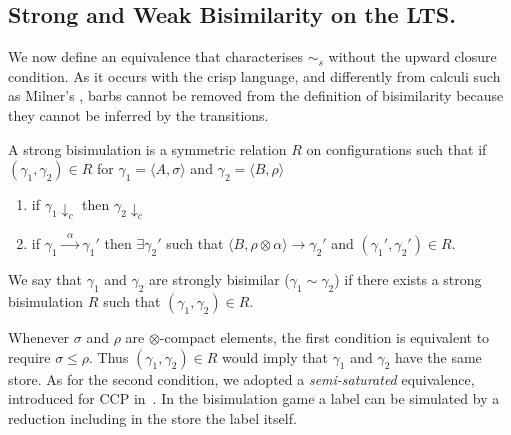 \documentclass[main.tex]{subfiles}
\begin{document}
\subsection{Strong and Weak Bisimilarity on the LTS.}
We now define an equivalence that
characterises  $\sim_{\mathit{s}}$ without the upward closure condition. 
As it occurs with the crisp language, and differently from calculi such as Milner's \CCS, 
barbs cannot be removed
from the definition of bisimilarity because they cannot be inferred by the transitions.


\begin{definition}\label{def:strong} 
A strong bisimulation is a symmetric relation $R$
on configurations such that if $(\gamma_1, \gamma_2) \in R$ for $\gamma_1 = \langle A, \sigma \rangle$ and $\gamma_2 = \langle B, \rho\rangle$
\begin{enumerate}
\item if $\gamma_1 \downarrow_c$ then $\gamma_2 \downarrow_c$
\item if $\gamma_1 \xrightarrow{\; \; \alpha\;  \;} \gamma_1'$ then $\exists \gamma_2'$
such that $\langle B, \rho \otimes \alpha \rangle \longrightarrow \gamma_2'$ and $(\gamma_1', \gamma_2') \in R$.
\end{enumerate}
We say that $\gamma_1$ and $\gamma_2$ are strongly bisimilar ($\gamma_1 \sim \gamma_2$) if there exists a strong
bisimulation $R$ such that $(\gamma_1, \gamma_2) \in R$.
\end{definition}

Whenever $\sigma$ and $\rho$ are $\otimes$-compact elements, the first condition is equivalent to require $\sigma \leq \rho.$ 
%
Thus $(\gamma_1, \gamma_2) \in R$ would
 imply that $\gamma_1$ and $\gamma_2$ have the same store.
 As for the second condition, we adopted a \emph{semi-saturated} equivalence, introduced 
 for CCP in~\cite{pippo}. In the bisimulation game a label can  be simulated 
 by a reduction including in the store the label itself.
\end{document}
